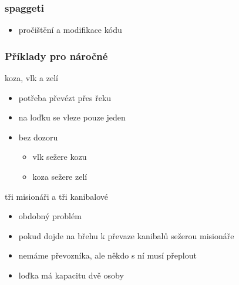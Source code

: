 \begin{frame}
	\frametitle{spaggeti}
	\begin{itemize}
		\item{pročištění a modifikace kódu}
	\end{itemize}
\end{frame}

\begin{frame}
	\frametitle{Příklady pro náročné}
	\begin{block}{koza, vlk a zelí}
		\begin{itemize}
			\item{potřeba převézt přes řeku}
			\item{na loďku se vleze pouze jeden}
			\item{bez dozoru}
			\begin{itemize}
				\item{vlk sežere kozu}
				\item{koza sežere zelí}
			\end{itemize}
		\end{itemize}
	\end{block}
	\begin{block}{tři misionáři a tři kanibalové}
		\begin{itemize}
			\item{obdobný problém}
			\item{pokud dojde na břehu k převaze kanibalů sežerou misionáře}
			\item{nemáme převozníka, ale někdo s ní musí přeplout}
			\item{loďka má kapacitu dvě osoby}
		\end{itemize}
	\end{block}
\end{frame}




